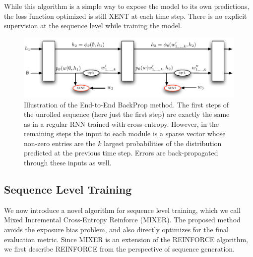While this algorithm is a simple way to expose the model to its own predictions, the loss function optimized is still XENT at each time step. 
There is no explicit supervision at the sequence level while training the model. 
\begin{figure}[!t]
\begin{center}
 \includegraphics[width=0.7\linewidth]{e2e.pdf}
\end{center}
\caption{Illustration of the End-to-End BackProp method. The first 
  steps of the unrolled sequence (here just the first step) are exactly the same
  as in a regular RNN trained with cross-entropy. However, in the remaining
  steps the input to each module is a sparse
  vector whose non-zero entries are the $k$ largest probabilities
  of the distribution predicted at the previous time step. Errors are
  back-propagated through these inputs as well.}
\label{fig:e2e}
\end{figure}

\subsection{Sequence Level Training}
We now introduce a novel algorithm for sequence level training, which we call Mixed Incremental Cross-Entropy Reinforce (MIXER). The proposed method avoids the exposure bias problem, 
and also directly optimizes for the final evaluation metric. 
Since MIXER is an extension of the REINFORCE algorithm, we first describe REINFORCE 
from the perspective of sequence generation. 

